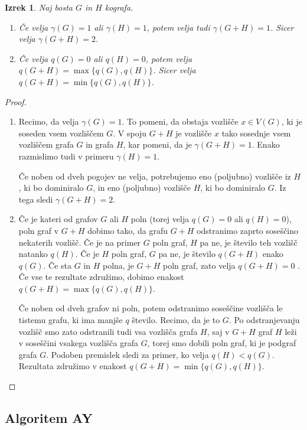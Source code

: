 \documentclass[12pt,a4paper,twoside]{article}
\theoremstyle{definition} %
\theoremstyle{plain} %
\newtheorem{izrek}[definicija]{Izrek}
\numberwithin{equation}{section}  %
\begin{document}
\begin{izrek} \label{theorem4.6}
Naj bosta $G$ in $H$ kografa.
\begin{enumerate}[label=(\roman*)]
\item Če velja $\gamma(G) = 1$ ali $\gamma(H) = 1$, potem velja tudi $\gamma(G + H) = 1$. Sicer velja $\gamma(G + H) = 2$.
\item Če velja $q(G) = 0$ ali $q(H) = 0$, potem velja $q(G + H) = \max\{q(G), q(H)\}$. Sicer velja $q(G + H) = \min\{q(G), q(H)\}$.
\end{enumerate}
\end{izrek}
\begin{proof}
\begin{enumerate}[label=($\roman*)$]
\item Recimo, da velja $\gamma(G) = 1$. To pomeni, da obstaja vozlišče $x \in V(G)$, ki je soseden vsem vozliščem $G$. V spoju $G + H$ je vozlišče $x$ tako sosednje vsem vozliščem grafa $G$ in grafa $H$, kar pomeni, da je $\gamma(G + H) = 1$. Enako razmislimo tudi v primeru $\gamma(H) = 1$.

Če noben od dveh pogojev ne velja, potrebujemo eno (poljubno) vozlišče iz $H$, ki bo dominiralo $G$, in eno (poljubno) vozlišče $H$, ki bo dominiralo $G$. Iz tega sledi $\gamma(G + H) = 2$.
\item Če je kateri od grafov $G$ ali $H$ poln (torej velja $q(G) = 0$ ali $q(H) = 0$), poln graf v $G + H$ dobimo tako, da grafu $G + H$ odstranimo zaprto soseščino nekaterih vozlišč. Če je na primer $G$ poln graf, $H$ pa ne, je število teh vozlišč natanko $q(H)$. Če je $H$ poln graf, $G$ pa ne, je število $q(G + H)$ enako $q(G)$. Če sta $G$ in $H$ polna, je $G + H$ poln graf, zato velja $q(G + H) = 0$ . Če vse te rezultate združimo, dobimo enakost $q(G + H) = \max\{q(G), q(H)\}$.

Če noben od dveh grafov ni poln, potem odstranimo soseščine vozlišča le tistemu grafu, ki ima manjše $q$ število. Recimo, da je to $G$. Po odstranjevanju vozlišč smo zato odstranili tudi vsa vozlišča grafa $H$, saj v $G + H$ graf $H$ leži v soseščini vsakega vozlišča grafa $G$, torej smo dobili poln graf, ki je podgraf grafa $G$. Podoben premislek sledi za primer, ko velja $q(H) < q(G)$. Rezultata združimo v enakost $q(G + H) = \min\{q(G), q(H)\}$.
\end{enumerate}
\end{proof}

\subsection{Algoritem AY}
\end{document}
